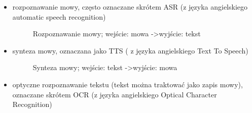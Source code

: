 \begin{itemize}
	\item rozpoznawanie mowy, często oznaczane skrótem ASR (z języka angielskiego automatic speech recognition)
		\setlength\fboxsep{20pt}
		\setlength\fboxrule{1pt}
		\begin{figure}[!h]
			\centering
			\caption{Rozpoznawanie mowy; wejście: mowa -\textgreater wyjście: tekst }\label{fig:hub_and_spoke}
		\end{figure}
	\item synteza mowy, oznaczana jako TTS ( z języka angielskiego Text To Speech)
		\setlength\fboxsep{20pt}
		\setlength\fboxrule{1pt}
		\begin{figure}[!h]
			\centering
			\caption{Synteza mowy; wejście: tekst -\textgreater wyjście: mowa}\label{fig:hub_and_spoke}
		\end{figure} 
\newpage
	\item optyczne rozpoznawanie tekstu (tekst można traktować jako zapis mowy), oznaczane skrótem OCR (z języka angielskiego Optical Character Recognition)
		\setlength\fboxsep{20pt}
		\setlength\fboxrule{1pt}
		\begin{figure}[!h]
			\centering

\end{figure}
\end{itemize}
